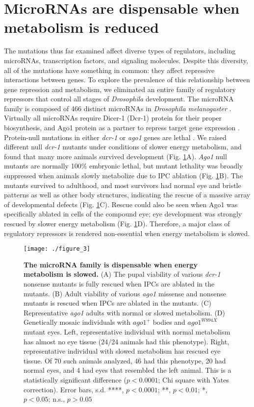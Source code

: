 \section{MicroRNAs are dispensable when metabolism is reduced}

The mutations thus far examined affect diverse types of regulators, including microRNAs, transcription factors, and signaling molecules. Despite this diversity, all of the mutations have something in common: they affect repressive interactions between genes. To explore the prevalence of this relationship between gene repression and metabolism, we eliminated an entire family of regulatory repressors that control all stages of \textit{Drosophila} development. The microRNA family is composed of 466 distinct microRNAs in \textit{Drosophila melanogaster} \cite{Kozomara2014}. Virtually all microRNAs require Dicer-1 (Dcr-1) protein for their proper biosynthesis, and Ago1 protein as a partner to repress target gene expression \cite{Carthew2009a}. Protein-null mutations in either \textit{dcr-1} or \textit{ago1} genes are lethal \cite{Pressman2012}. We raised different null \textit{dcr-1} mutants under conditions of slower energy metabolism, and found that many more animals survived development (Fig. \ref{fig:metabolism:fig3}A). \textit{Ago1} null mutants are normally 100\% embryonic lethal, but mutant lethality was broadly suppressed when animals slowly metabolize due to IPC ablation (Fig. \ref{fig:metabolism:fig3}B). The mutants survived to adulthood, and most survivors had normal eye and bristle patterns as well as other body structures, indicating the rescue of a massive array of developmental defects (Fig. \ref{fig:metabolism:fig3}C). Rescue could also be seen when Ago1 was specifically ablated in cells of the compound eye; eye development was strongly rescued by slower energy metabolism (Fig. \ref{fig:metabolism:fig3}D). Therefore, a major class of regulatory repressors is rendered non-essential when energy metabolism is slowed.

\begin{figure}[h!]
\centering
\texttt{[image: ./figure\_3]}
\caption[All microRNAs are dispensable when energy metabolism is slowed.]{\textbf{The microRNA family is dispensable when energy metabolism is slowed.} (A) The pupal viability of various \textit{dcr-1} nonsense mutants is fully rescued when IPCs are ablated in the mutants. (B) Adult viability of various \textit{ago1} missense and nonsense mutants is rescued when IPCs are ablated in the mutants. (C) Representative \textit{ago1} adults with normal or slowed metabolism. (D) Genetically mosaic individuals with $ago1^+$ bodies and $ago1^{W894X}$ mutant eyes. Left, representative individual with normal metabolism has almost no eye tissue (24/24 animals had this phenotype). Right, representative individual with slowed metabolism has rescued eye tissue. Of 70 such animals analyzed, 46 had this phenotype, 20 had normal eyes, and 4 had eyes that resembled the left animal. This is a statistically significant difference ($p<0.0001$; Chi square with Yates correction). Error bars, s.d. ****, $p<0.0001$; **, $p<0.01$; *, $p<0.05$; n.s., $p>0.05$}
\label{fig:metabolism:fig3}
\end{figure}

